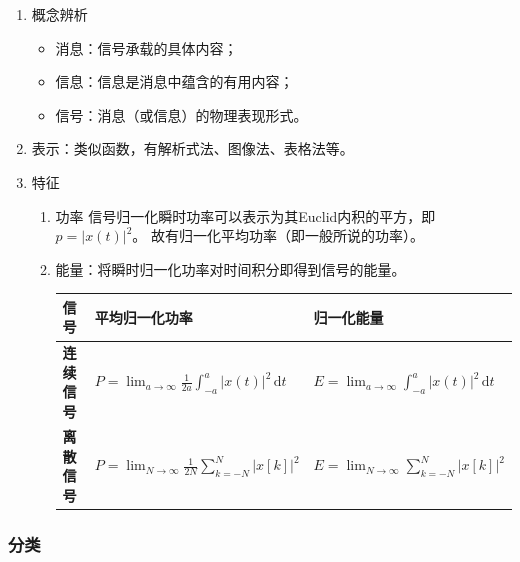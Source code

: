 \documentclass[UTF8,fontset=fandol,zihao=5]{ctexart}
\newcommand{\dd}{\,\mathrm{d}}
\begin{document}
\begin{enumerate}
  
  \item 概念辨析
  \begin{itemize}
    \item 消息：信号承载的具体内容；
    \item 信息：信息是消息中蕴含的有用内容；
    \item 信号：消息（或信息）的物理表现形式。
  \end{itemize}

  \item 表示：类似函数，有解析式法、图像法、表格法等。

  \item 特征
  \begin{enumerate}[label=(\arabic*)]

    \item 功率
信号归一化瞬时功率可以表示为其Euclid内积的平方，即$p = \left | x(t) \right |^2$。
故有归一化平均功率（即一般所说的功率）。
    \item 能量：将瞬时归一化功率对时间积分即得到信号的能量。

\begin{center}
\begin{tabularx}{0.98\textwidth}{>{\bfseries}p{1.5cm}X X}
\toprule
信号 & 平均归一化功率 & 归一化能量 \\
\midrule
连续信号 & $P =\displaystyle \lim_{a \to \infty} \frac{1}{2a} \displaystyle\int_{-a}^{a} \left | x \left (t \right ) \right |^2 \dd t$ & $E = \displaystyle \lim_{a \to \infty} \displaystyle \int_{-a}^{a} \left | x \left (t \right ) \right |^2 \dd t$ \\
离散信号 & $P =\displaystyle \lim_{N \to \infty} \frac{1}{2N} \displaystyle\sum_{k=-N}^{N} \left | x \left [ k \right ] \right |^2$ & $E = \displaystyle \lim_{N \to \infty} \displaystyle \sum_{k=-N}^{N} \left | x \left [ k \right ] \right |^2$ \\
\bottomrule
\end{tabularx}
\end{center}

  \end{enumerate}
\end{enumerate}

\subsubsection{分类}
\end{document}
